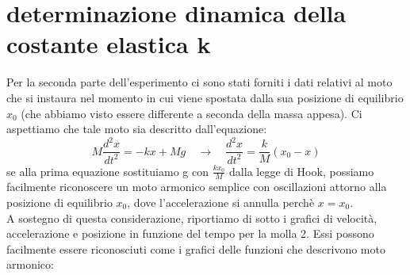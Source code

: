 \documentclass[a4paper]{article}
\theoremstyle{definition}
\begin{document}
	\section*{determinazione dinamica della costante elastica k}
	Per la seconda parte dell'esperimento ci sono stati forniti i dati relativi al moto che si instaura nel momento in cui viene spostata dalla sua posizione di equilibrio \(x_{0}\) (che abbiamo visto essere differente a seconda della massa appesa). Ci aspettiamo che tale moto sia descritto dall'equazione:
	\[M \frac{d^{2}x}{dt^{2}} = -kx + Mg \quad \rightarrow \quad  \frac{d^{2}x}{dt^{2}} = \frac{k}{M}(x_{0}-x)\]
	se alla prima equazione sostituiamo g con \(\frac{kx_{0}}{M}\) dalla legge di Hook, possiamo facilmente riconoscere un moto armonico semplice con oscillazioni attorno alla posizione di equilibrio \(x_{0}\), dove l'accelerazione si annulla perchè \(x=x_{0}\).\\
	A sostegno di questa considerazione, riportiamo di sotto i grafici di velocità, accelerazione e posizione in funzione del tempo per la molla 2. Essi possono facilmente essere riconosciuti come i grafici delle funzioni che descrivono moto armonico:\\

\begin{figure}[!htbp]
\end{figure}

	\begin{figure}[!htbp]
	\end{figure}
\end{document}
